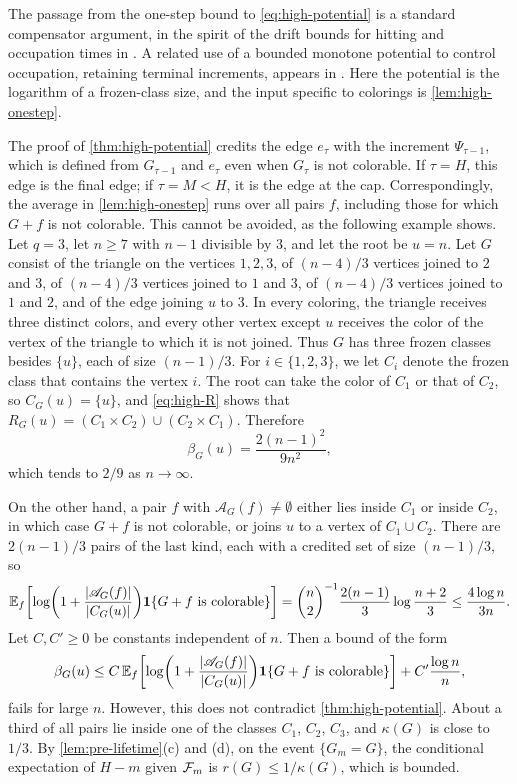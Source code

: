 The passage from the one-step bound to \eqref{eq:high-potential} is a standard compensator argument, in the spirit of the drift bounds for hitting and occupation times in \cite[Sections~2--3]{hajek1982hitting}. A related use of a bounded monotone potential to control occupation, retaining terminal increments, appears in \cite[Lemmas~2.2 and~4.1]{openai2026linear}. Here the potential is the logarithm of a frozen-class size, and the input specific to colorings is \cref{lem:high-onestep}.

\begin{remark}\label{rem:high-killing}
The proof of \cref{thm:high-potential} credits the edge $e_\tau$ with the increment $\Psi_{\tau - 1}$, which is defined from $G_{\tau - 1}$ and $e_\tau$ even when $G_\tau$ is not colorable. If $\tau = H$, this edge is the final edge; if $\tau = M < H$, it is the edge at the cap. Correspondingly, the average in \cref{lem:high-onestep} runs over all pairs $f$, including those for which $G + f$ is not colorable. This cannot be avoided, as the following example shows. Let $q = 3$, let $n \ge 7$ with $n - 1$ divisible by $3$, and let the root be $u = n$. Let $G$ consist of the triangle on the vertices $1, 2, 3$, of $(n - 4)/3$ vertices joined to $2$ and $3$, of $(n - 4)/3$ vertices joined to $1$ and $3$, of $(n - 4)/3$ vertices joined to $1$ and $2$, and of the edge joining $u$ to $3$. In every coloring, the triangle receives three distinct colors, and every other vertex except $u$ receives the color of the vertex of the triangle to which it is not joined. Thus $G$ has three frozen classes besides $\{u\}$, each of size $(n - 1)/3$. For $i \in \{1, 2, 3\}$, we let $C_i$ denote the frozen class that contains the vertex $i$. The root can take the color of $C_1$ or that of $C_2$, so $C_G(u) = \{u\}$, and \eqref{eq:high-R} shows that $R_G(u) = (C_1 \times C_2) \cup (C_2 \times C_1)$. Therefore
\[
\beta_G(u) = \frac{2 (n - 1)^2}{9 n^2},
\]
which tends to $2/9$ as $n \to \infty$.

On the other hand, a pair $f$ with $\mathscr{A}_G(f) \ne \emptyset$ either lies inside $C_1$ or inside $C_2$, in which case $G + f$ is not colorable, or joins $u$ to a vertex of $C_1 \cup C_2$. There are $2(n - 1)/3$ pairs of the last kind, each with a credited set of size $(n - 1)/3$, so
\[
\mathbb E_f \biggl[ \log \biggl( 1 + \frac{\left|\mathscr{A}_G(f)\right|}{\left|C_G(u)\right|} \biggr) \mathbf 1 \{ G + f \text{ is colorable} \} \biggr] = \binom{n}{2}^{-1} \frac{2(n - 1)}{3} \log \frac{n + 2}{3} \le \frac{4 \log n}{3n}.
\]
Let $C, C' \ge 0$ be constants independent of $n$. Then a bound of the form
\[
\beta_G(u) \le C \, \mathbb E_f \biggl[ \log \biggl( 1 + \frac{\left|\mathscr{A}_G(f)\right|}{\left|C_G(u)\right|} \biggr) \mathbf 1 \{ G + f \text{ is colorable} \} \biggr] + C' \frac{\log n}{n},
\]
fails for large $n$. However, this does not contradict \cref{thm:high-potential}. About a third of all pairs lie inside one of the classes $C_1$, $C_2$, $C_3$, and $\kappa(G)$ is close to $1/3$. By \cref{lem:pre-lifetime}(c) and (d), on the event $\{G_m = G\}$, the conditional expectation of $H - m$ given $\mathcal F_m$ is $r(G) \le 1/\kappa(G)$, which is bounded.
\end{remark}

